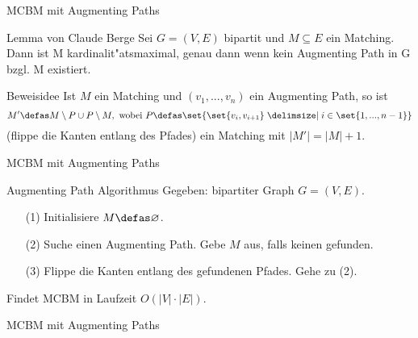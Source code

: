 \begin{frame}{MCBM mit Augmenting Paths}
\begin{block}{Lemma von Claude Berge}
Sei \(G = (V,E)\) bipartit und \(M \subseteq E\) ein Matching. \pause Dann ist M kardinalit"atsmaximal, genau dann wenn kein Augmenting Path in G bzgl. M existiert.
\end{block}\pause
\begin{block}{Beweisidee}\pause
Ist \(M\) ein Matching und \((v_1,...,v_n)\) ein Augmenting Path\pause, so ist
\[
M' \defas M \setminus P \cup P \setminus M, \text{ wobei } P \defas \set{\set{v_i, v_{i+1}} \given i \in \set{1,...,n-1}}
\]
(flippe die Kanten entlang des Pfades) ein Matching mit \(|M'| = |M| + 1\).
\end{block}
\end{frame}

\begin{frame}{MCBM mit Augmenting Paths}
\begin{block}{Augmenting Path Algorithmus}
Gegeben: bipartiter Graph \(G = (V, E)\).
\begin{itemize}
\pause\item[(1)] Initialisiere \(M \defas \varnothing\).
\pause\item[(2)] Suche einen Augmenting Path. Gebe \(M\) aus, falls keinen gefunden.
\pause\item[(3)] Flippe die Kanten entlang des gefundenen Pfades. Gehe zu (2).
\end{itemize}\pause
Findet MCBM in Laufzeit \(O(|V|\cdot |E|)\).
\end{block}
\end{frame}

\begin{frame}{MCBM mit Augmenting Paths}

\begin{figure}
\end{figure}
\end{frame}

